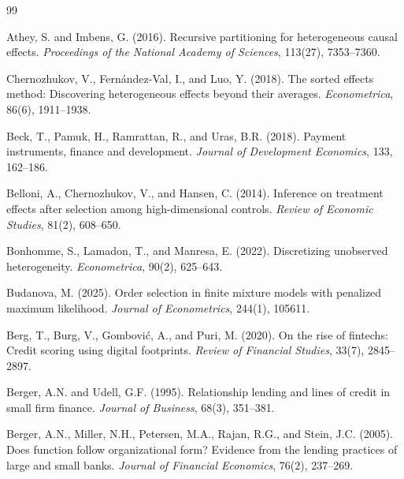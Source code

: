 \documentclass[12pt]{article}
\begin{document}

\newpage
\singlespacing



\begin{thebibliography}{99}

Athey, S. and Imbens, G. (2016). Recursive partitioning for heterogeneous causal effects. \textit{Proceedings of the National Academy of Sciences}, 113(27), 7353--7360.

Chernozhukov, V., Fern{\'a}ndez-Val, I., and Luo, Y. (2018). The sorted effects method: Discovering heterogeneous effects beyond their averages. \textit{Econometrica}, 86(6), 1911--1938.

Beck, T., Pamuk, H., Ramrattan, R., and Uras, B.R. (2018). Payment instruments, finance and development. \textit{Journal of Development Economics}, 133, 162--186.

Belloni, A., Chernozhukov, V., and Hansen, C. (2014). Inference on treatment effects after selection among high-dimensional controls. \textit{Review of Economic Studies}, 81(2), 608--650.

Bonhomme, S., Lamadon, T., and Manresa, E. (2022). Discretizing unobserved heterogeneity. \textit{Econometrica}, 90(2), 625--643.

Budanova, M. (2025). Order selection in finite mixture models with penalized maximum likelihood. \textit{Journal of Econometrics}, 244(1), 105611.

Berg, T., Burg, V., Gombovi{\'c}, A., and Puri, M. (2020). On the rise of fintechs: Credit scoring using digital footprints. \textit{Review of Financial Studies}, 33(7), 2845--2897.

Berger, A.N. and Udell, G.F. (1995). Relationship lending and lines of credit in small firm finance. \textit{Journal of Business}, 68(3), 351--381.

Berger, A.N., Miller, N.H., Petersen, M.A., Rajan, R.G., and Stein, J.C. (2005). Does function follow organizational form? Evidence from the lending practices of large and small banks. \textit{Journal of Financial Economics}, 76(2), 237--269.


\end{thebibliography}
\end{document}
